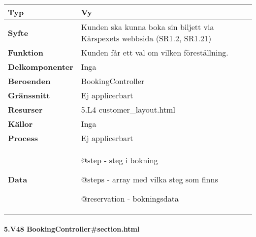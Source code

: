 \documentclass[a4paper, twoside, 11pt, titlepage]{article}
\begin{document}
			\begin {table} [ht] \begin{tabular} {  p{3.5cm} p{11.6cm} }
				\hline
				{\sffamily\textbf{Typ}} & {Vy} \\
				\hline
				{\sffamily\textbf{Syfte}} & {Kunden ska kunna boka sin biljett via Kårspexets webbsida (SR1.2, SR1.21)} \\
				\hline
				{\sffamily\textbf{Funktion}} & {Kunden får ett val om vilken föreställning.} \\
				\hline
				{\sffamily\textbf{Delkomponenter}} & {Inga} \\
				\hline
				{\sffamily\textbf{Beroenden}} & {BookingController} \\
				\hline
				{\sffamily\textbf{Gränssnitt}} & {Ej applicerbart} \\
				\hline
				{\sffamily\textbf{Resurser}} & {5.L4 customer\_layout.html } \\
				\hline
				{\sffamily\textbf{Källor}} & {Inga} \\
				\hline
				{\sffamily\textbf{Process}} & {Ej applicerbart} \\
				\hline
				{\sffamily\textbf{Data}} & {@step - steg i bokning

@steps - array med vilka steg som finns

@reservation - bokningsdata} \\
				\hline
			\end{tabular} \end{table} \FloatBarrier


			\clearpage %
			\paragraph{5.V48 BookingController\#section.html}\
\end{document}
